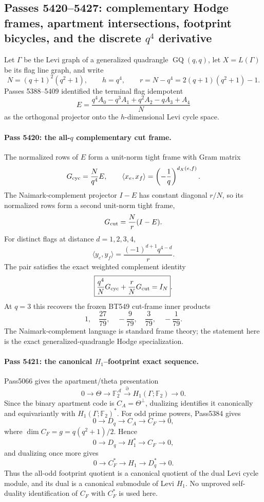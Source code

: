 \ifdefined\WPassFiveFourTwoZeroLoaded\else
\gdef\WPassFiveFourTwoZeroLoaded{1}
\subsection*{Passes 5420--5427: complementary Hodge frames, apartment intersections, footprint bicycles, and the discrete $q^4$ derivative}

Let $\Gamma$ be the Levi graph of a generalized quadrangle $\operatorname{GQ}(q,q)$, let $X=L(\Gamma)$ be its flag line graph, and write
\[
 N=(q+1)^2(q^2+1),\qquad h=q^4,\qquad r=N-q^4=2(q+1)(q^2+1)-1.
\]
Passes 5388--5409 identified the terminal flag idempotent
\[
 E=\frac{q^4A_0-q^3A_1+q^2A_2-qA_3+A_4}{N}
\]
as the orthogonal projector onto the $h$-dimensional Levi cycle space.

\paragraph{Pass 5420: the all-$q$ complementary cut frame.}
The normalized rows of $E$ form a unit-norm tight frame with Gram matrix
\[
 G_{\rm cyc}=\frac{N}{q^4}E,
 \qquad
 \langle x_e,x_f\rangle=\left(-\frac1q\right)^{d_X(e,f)}.
\]
The Naimark-complement projector $I-E$ has constant diagonal $r/N$, so its normalized rows form a second unit-norm tight frame,
\[
 G_{\rm cut}=\frac{N}{r}(I-E).
\]
For distinct flags at distance $d=1,2,3,4$,
\[
 \boxed{\langle y_e,y_f\rangle=\frac{(-1)^{d+1}q^{4-d}}{r}}.
\]
The pair satisfies the exact weighted complement identity
\[
 \boxed{\frac{q^4}{N}G_{\rm cyc}+\frac{r}{N}G_{\rm cut}=I_N}.
\]
At $q=3$ this recovers the frozen BT549 cut-frame inner products
\[
 1,\quad \frac{27}{79},\quad-\frac9{79},\quad\frac3{79},\quad-\frac1{79}.
\]
The Naimark-complement language is standard frame theory; the statement here is the exact generalized-quadrangle Hodge specialization.

\paragraph{Pass 5421: the canonical $H_1$--footprint exact sequence.}
Pass5066 gives the apartment/theta presentation
\[
 0\longrightarrow\Theta\longrightarrow\mathbb F_2^{\mathcal A}
 \stackrel{\partial}{\longrightarrow}H_1(\Gamma;\mathbb F_2)\longrightarrow0.
\]
Since the binary apartment code is $C_A=\Theta^\perp$, dualizing identifies it canonically and equivariantly with $H_1(\Gamma;\mathbb F_2)^*$.  For odd prime powers, Pass5384 gives
\[
 0\longrightarrow D_q\longrightarrow C_A\longrightarrow C_F\longrightarrow0,
\]
where $\dim C_F=g=q(q^2+1)/2$.  Hence
\[
 \boxed{0\longrightarrow D_q\longrightarrow H_1^*\longrightarrow C_F\longrightarrow0},
\]
and dualizing once more gives
\[
 \boxed{0\longrightarrow C_F^*\longrightarrow H_1\longrightarrow D_q^*\longrightarrow0}.
\]
Thus the all-odd footprint quotient is a canonical quotient of the dual Levi cycle module, and its dual is a canonical submodule of Levi $H_1$.  No unproved self-duality identification of $C_F$ with $C_F^*$ is used here.

